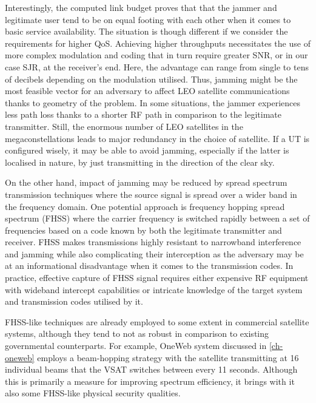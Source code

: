 \documentclass[english, 12pt, a4paper, elec, utf8, a-1b, online]{aaltothesis}
\begin{document}
Interestingly, the computed link budget proves that that the jammer and legitimate user tend to be on equal footing with each other when it comes to basic service availability. The situation is though different if we consider the requirements for higher QoS.
Achieving higher throughputs necessitates the use of more complex modulation and coding that in turn require greater SNR, or in our case SJR, at the receiver's end. Here, the advantage can range from single to tens of decibels depending on the modulation utilised.
Thus, jamming might be the most feasible vector for an adversary to affect LEO satellite communications thanks to geometry of the problem.
In some situations, the jammer experiences less path loss thanks to a shorter RF path in comparison to the legitimate transmitter.
Still, the enormous number of LEO satellites in the megaconstellations leads to major redundancy in the choice of satellite.
If a UT is configured wisely, it may be able to avoid jamming, especially if the latter is localised in nature, by just transmitting in the direction of the clear sky.

On the other hand, impact of jamming may be reduced by spread spectrum transmission techniques where the source signal is spread over a wider band in the frequency domain.
One potential approach is frequency hopping spread spectrum (FHSS) where the carrier frequency is switched rapidly between a set of frequencies based on a code known by both the legitimate transmitter and receiver.
FHSS makes transmissions highly resistant to narrowband interference and jamming while also complicating their interception as the adversary may be at an informational disadvantage when it comes to the transmission codes.
In practice, effective capture of FHSS signal requires either expensive RF equipment with wideband intercept capabilities or intricate knowledge of the target system and transmission codes utilised by it.

FHSS-like techniques are already employed to some extent in commercial satellite systems, although they tend to not as robust in comparison to existing governmental counterparts.
For example, OneWeb system discussed in \ref{ch-oneweb} employs a beam-hopping strategy with the satellite transmitting at 16 individual beams that the VSAT switches between every 11 seconds.
Although this is primarily a measure for improving spectrum efficiency, it brings with it also some FHSS-like physical security qualities.

\end{document}
